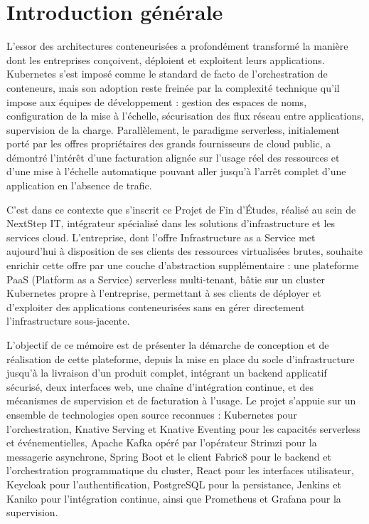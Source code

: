 \chapter*{Introduction générale}

L'essor des architectures conteneurisées a profondément transformé la manière dont les entreprises conçoivent, déploient et exploitent leurs applications. Kubernetes s'est imposé comme le standard de facto de l'orchestration de conteneurs, mais son adoption reste freinée par la complexité technique qu'il impose aux équipes de développement : gestion des espaces de noms, configuration de la mise à l'échelle, sécurisation des flux réseau entre applications, supervision de la charge. Parallèlement, le paradigme serverless, initialement porté par les offres propriétaires des grands fournisseurs de cloud public, a démontré l'intérêt d'une facturation alignée sur l'usage réel des ressources et d'une mise à l'échelle automatique pouvant aller jusqu'à l'arrêt complet d'une application en l'absence de trafic.

C'est dans ce contexte que s'inscrit ce Projet de Fin d'Études, réalisé au sein de NextStep IT, intégrateur spécialisé dans les solutions d'infrastructure et les services cloud. L'entreprise, dont l'offre Infrastructure as a Service met aujourd'hui à disposition de ses clients des ressources virtualisées brutes, souhaite enrichir cette offre par une couche d'abstraction supplémentaire : une plateforme PaaS (Platform as a Service) serverless multi-tenant, bâtie sur un cluster Kubernetes propre à l'entreprise, permettant à ses clients de déployer et d'exploiter des applications conteneurisées sans en gérer directement l'infrastructure sous-jacente.

L'objectif de ce mémoire est de présenter la démarche de conception et de réalisation de cette plateforme, depuis la mise en place du socle d'infrastructure jusqu'à la livraison d'un produit complet, intégrant un backend applicatif sécurisé, deux interfaces web, une chaîne d'intégration continue, et des mécanismes de supervision et de facturation à l'usage. Le projet s'appuie sur un ensemble de technologies open source reconnues : Kubernetes pour l'orchestration, Knative Serving et Knative Eventing pour les capacités serverless et événementielles, Apache Kafka opéré par l'opérateur Strimzi pour la messagerie asynchrone, Spring Boot et le client Fabric8 pour le backend et l'orchestration programmatique du cluster, React pour les interfaces utilisateur, Keycloak pour l'authentification, PostgreSQL pour la persistance, Jenkins et Kaniko pour l'intégration continue, ainsi que Prometheus et Grafana pour la supervision.

